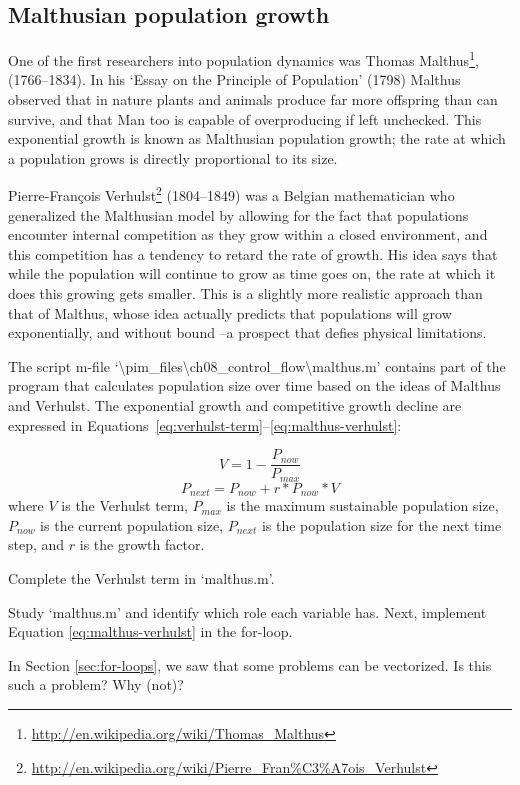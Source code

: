 \subsection{Malthusian population growth}

One of the first researchers into population dynamics was Thomas Malthus\footnote{\url{http://en.wikipedia.org/wiki/Thomas_Malthus}}, (1766--1834). In his `Essay on the Principle of Population' (1798) Malthus observed that in nature plants and animals produce far more offspring than can survive, and that Man too is capable of overproducing if left unchecked. This exponential growth is known as Malthusian population growth; the rate at which a population grows is directly proportional to its size.

Pierre-Fran\c cois Verhulst\footnote{\url{http://en.wikipedia.org/wiki/Pierre_Fran\%C3\%A7ois_Verhulst}} (1804--1849) was a Belgian mathematician who generalized the Malthusian model by allowing for the fact that populations encounter internal competition as they grow within a closed environment, and this competition has a tendency to retard the rate of growth. His idea says that while the population will continue to grow as time goes on, the rate at which it does this growing gets smaller. This is a slightly more realistic approach than that of Malthus, whose idea actually predicts that populations will grow exponentially, and without bound --a prospect that defies physical limitations. 

The script m-file `\textbackslash{}pim\_files\textbackslash{}ch08\_control\_flow\textbackslash{}malthus.m' contains part of the program that calculates population size over time based on the ideas of Malthus and Verhulst. The exponential growth and competitive growth decline are expressed in Equations~\ref{eq:verhulst-term}--\ref{eq:malthus-verhulst}:


\begin{equation}
\label{eq:verhulst-term}
V=1-\frac{P_{now}}{P_{max}}
\end{equation}
\begin{equation}
\label{eq:malthus-verhulst}
P_{next}=P_{now}+r*P_{now}*V
\end{equation}
where $V$ is the Verhulst term, $P_{max}$ is the maximum sustainable population size, $P_{now}$ is the current population size, $P_{next}$ is the population size for the next time step, and $r$ is the growth factor.

\begin{action}
Complete the Verhulst term in `malthus.m'.
\end{action}
\begin{action}
Study `malthus.m' and identify which role each variable has. Next, implement Equation \ref{eq:malthus-verhulst} in the for-loop.
\end{action}
\begin{action}
In Section \ref{sec:for-loops}, we saw that some problems can be vectorized. Is this such a problem? Why (not)?
\end{action}


